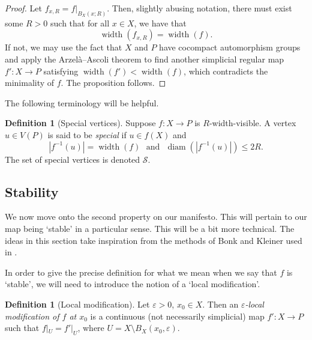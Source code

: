 \documentclass[11pt,a4paper]{amsart}
\DeclareMathOperator{\diam}{diam}
\DeclareMathOperator{\dist}{d}
\DeclareMathOperator{\width}{width}
\theoremstyle{definition}
\newtheorem{definition}[theorem]{Definition}
\begin{document}
\begin{proof}
    Let $f_{x,R} = f|_{B_X(x;R)}$. Then, slightly abusing notation, there must exist some $R > 0$ such that for all $x \in X$, we have that
    $$
    \width(f_{x,R}) = \width(f).
    $$
    If not, we may use the fact that $X$ and $P$ have cocompact automorphism groups and apply the Arzel\`a--Ascoli theorem to find another simplicial regular map $f' : X \to P$ satisfying $\width(f') < \width(f)$, which contradicts the minimality of $f$. The proposition follows.
\end{proof}

The following terminology will be helpful.

\begin{definition}[Special vertices]\label{def:special}
    Suppose $f : X \to P$ is $R$-width-visible.
	A vertex $u \in V(P)$ is said to be \emph{special} if $u \in f(X)$ and 
    $$
    |f^{-1}(u)|=\width(f) \ \ \ \text{and} \ \ \ \diam(|f^{-1}(u)|) \leq 2R.
    $$ 
    The set of special vertices is denoted $\mathscr S$. 
\end{definition}



\subsection{Stability}

We now move onto the second property on our manifesto. This will pertain to our map being `stable' in a particular sense. This will be a bit more technical. The ideas in this section take inspiration from the methods of Bonk and Kleiner used in \cite{bonk2002rigidity}.

In order to give the precise definition for what we mean when we say that $f$ is `stable', we will need to introduce the notion of a `local modification'.

\begin{definition}[Local modification]
    Let $\varepsilon > 0$, $x_0 \in X$. Then an \emph{$\varepsilon$-local modification of $f$ at $x_0$} is a continuous (not necessarily simplicial) map $f' : X \to P$ such that  $f|_U = f'|_U$, where $U = X \setminus B_X(x_0,\varepsilon)$.

\end{definition}
\end{document}
